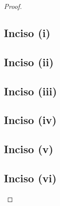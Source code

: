 \begin{proof}
	\subsection{Inciso (i)} 
	
	\newpage
	
	\subsection{Inciso (ii)} 
	
	\newpage
		
	\subsection{Inciso (iii)} \label{problema1_4:inciso3}
	
	\newpage
	
	\subsection{Inciso (iv)} 
	
	\newpage
	
	\subsection{Inciso (v)}
	
	\newpage
	
	\subsection{Inciso (vi)}
	
\end{proof}